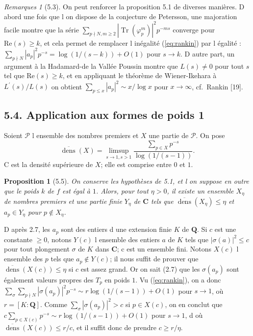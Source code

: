\documentclass[11pt]{amsart}
\theoremstyle{plain}
\newtheorem{proposition}[theoreme]{Proposition}
\theoremstyle{definition}
\theoremstyle{remark}
\newtheorem{remarques}[theoreme]{Remarques}
\DeclareMathOperator{\Tr}{Tr}
\DeclareMathOperator{\dens}{dens}
\newcommand{\Q}{\mathbf{Q}}
\newcommand{\C}{\mathbf{C}}
\begin{document}
\begin{remarques}[5.3]
On peut renforcer la proposition 5.1 de diverses mani\`eres. D abord une fois que l on dispose de la conjecture de Petersson, une majoration facile montre que la s\'erie $\sum_{p \nmid N, m \ge 2} |\Tr(\varphi_p^m)|^2 p^{-ms}$ converge pour $\mathrm{Re}(s) \ge k$, et cela permet de remplacer l in\'egalit\'e (\ref{eq:rankin}) par l \'egalit\'e : $\sum_{p \nmid N} |a_p|^2 p^{-s} = \log(1/(s-k)) + O(1)$ pour $s \to k$. D autre part, un argument \`a la Hadamard-de la Vall\'ee Poussin montre que $L(s) \ne 0$ pour tout $s$ tel que $\mathrm{Re}(s) \ge k$, et en appliquant le th\'eor\`eme de Wiener-Ikehara \`a $L^\prime(s)/L(s)$ on obtient $\sum_{p \le x} |a_p|^2 \sim x/\log x$ pour $x \to \infty$, cf.~Rankin [19].
\end{remarques}

\subsection*{5.4. Application aux formes de poids 1}

Soient $\mathcal{P}$ l ensemble des nombres premiers et $X$ une partie de $\mathcal{P}$. On pose
\begin{equation}\label{eq:dens}\overline{\dens}(X) = \limsup_{s \to 1, s > 1} \frac{\sum_{p \in X} p^{-s}}{\log(1/(s-1))}.\end{equation}
C est la densit\'e sup\'erieure de $X$; elle est comprise entre $0$ et $1$.

\begin{proposition}[5.5]
On conserve les hypoth\`eses de 5.1, et l on suppose en outre que le poids $k$ de $f$ est \'egal \`a $1$. Alors, pour tout $\eta > 0$, il existe un ensemble $X_\eta$ de nombres premiers et une partie finie $Y_\eta$ de $\C$ tels que $\overline{\dens}(X_\eta) \le \eta$ et $a_p \in Y_\eta$ pour $p \notin X_\eta$.
\end{proposition}

D apr\`es 2.7, les $a_p$ sont des entiers d une extension finie $K$ de $\Q$. Si $c$ est une constante $\ge 0$, notons $Y(c)$ l ensemble des entiers $a$ de $K$ tels que $|\sigma(a)|^2 \le c$ pour tout plongement $\sigma$ de $K$ dans $\C$; c est un ensemble fini. Notons $X(c)$ l ensemble des $p$ tels que $a_p \notin Y(c)$; il nous suffit de prouver que $\overline{\dens}(X(c)) \le \eta$ si $c$ est assez grand. Or on sait (2.7) que les $\sigma(a_p)$ sont \'egalement valeurs propres des $T_p$ en poids $1$. Vu (\ref{eq:rankin}), on a donc $\sum_\sigma \sum_{p \nmid N} |\sigma(a_p)|^2 p^{-s} \sim r \log(1/(s-1)) + O(1)$ pour $s \to 1$, o\`u $r = [K:\Q]$. Comme $\sum_\sigma |\sigma(a_p)|^2 > c$ si $p \in X(c)$, on en conclut que $c \sum_{p \in X(c)} p^{-s} \sim r \log(1/(s-1)) + O(1)$ pour $s \to 1$, d o\`u $\overline{\dens}(X(c)) \le r/c$, et il suffit donc de prendre $c \ge r/\eta$.
\end{document}

